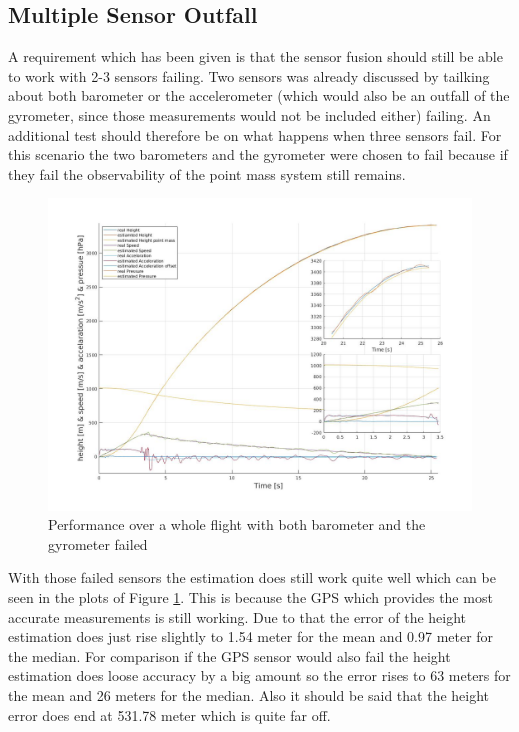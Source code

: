 \newpage
\subsection{Multiple Sensor Outfall}
A requirement which has been given is that the sensor fusion should still be able to work with 2-3 sensors failing.
Two sensors was already discussed by tailking about both barometer or the accelerometer
(which would also be an outfall of the gyrometer, since those measurements would not be included either) failing.
An additional test should therefore be on what happens when three sensors fail.
For this scenario the two barometers and the gyrometer were chosen to fail because if they fail the observability of the point mass system still remains.

\begin{figure}[h!]
 \centering
 \includegraphics[width=.8\textwidth]{./Pictures/BestSystemPerformanceAccOutfall.jpg}
 \caption{Performance over a whole flight with both barometer and the gyrometer failed}
 \label{fig:PerformanceMOutfall}
\end{figure}

With those failed sensors the estimation does still work quite well which can be seen in the plots of Figure \ref{fig:PerformanceMOutfall}.
This is because the GPS which provides the most accurate measurements is still working.
Due to that the error of the height estimation does just rise slightly to 1.54 meter for the mean and 0.97 meter for the median.
For comparison if the GPS sensor would also fail the height estimation does loose accuracy by a big amount so the error rises to 63 meters for the mean and 26 meters for the median.
Also it should be said that the height error does end at 531.78 meter which is quite far off.
